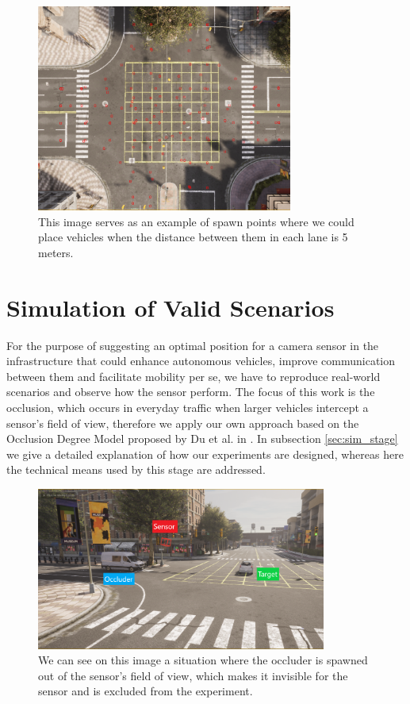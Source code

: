 \begin{figure} [h!]
    \centering
    \includegraphics[width=0.75\textwidth]{images/waypoints_target.png}
    \caption[Vehicle waypoints with specified distance]{This image serves as an example of spawn points where we could place vehicles when the distance between them in each lane is 5 meters.}
    \label{fig:distance_waypoints}
\end{figure}

\section{Simulation of Valid Scenarios}
For the purpose of suggesting an optimal position for a camera sensor in the infrastructure that could enhance autonomous vehicles, improve communication between them and facilitate mobility per se, we have to reproduce real-world scenarios and observe how the sensor perform. The focus of this work is the occlusion, which occurs in everyday traffic when larger vehicles intercept a sensor's field of view, therefore we apply our own approach based on the Occlusion Degree Model proposed by Du et al. in \cite{occlusion_degree_model}. In subsection \ref{sec:sim_stage} we give a detailed explanation of how our experiments are designed, whereas here the technical means used by this stage are addressed.

\begin{figure} [h!]
    \centering
    \includegraphics[width=0.85\textwidth]{images/behind_sensor.png}
    \caption[Vehicle spawned behind the camera]{We can see on this image a situation where the occluder is spawned out of the sensor's field of view, which makes it invisible for the sensor and is excluded from the experiment.}
    \label{fig:behind_sensor}
\end{figure}

